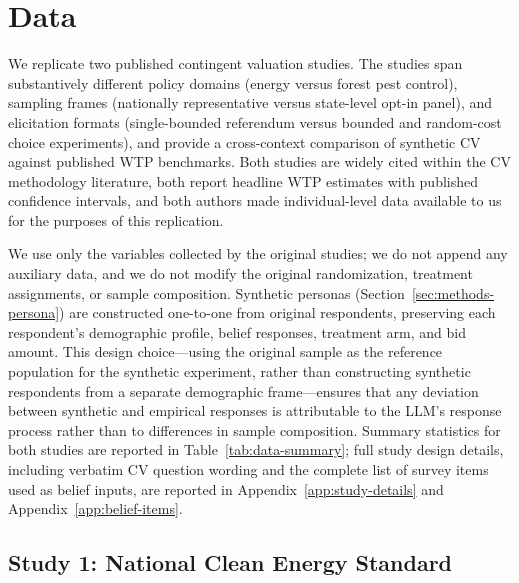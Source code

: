 \documentclass[12pt]{article}
\begin{document}
%

\section{Data}\label{sec:data}

We replicate two published contingent valuation studies. The studies span
substantively different policy domains (energy versus forest pest control),
sampling frames (nationally representative versus state-level opt-in panel),
and elicitation formats (single-bounded referendum versus bounded and
random-cost choice experiments), and provide a cross-context comparison of
synthetic CV against published WTP benchmarks. Both studies are widely
cited within the CV methodology literature, both report headline WTP
estimates with published confidence intervals, and both authors made
individual-level data available to us for the purposes of this replication.

We use only the variables collected by the original studies; we do not
append any auxiliary data, and we do not modify the original randomization,
treatment assignments, or sample composition. Synthetic personas
(Section~\ref{sec:methods-persona}) are constructed one-to-one from
original respondents, preserving each respondent's demographic profile,
belief responses, treatment arm, and bid amount. This design choice---using
the original sample as the reference population for the synthetic
experiment, rather than constructing synthetic respondents from a separate
demographic frame---ensures that any deviation between synthetic and
empirical responses is attributable to the LLM's response process rather
than to differences in sample composition. Summary statistics for both
studies are reported in Table~\ref{tab:data-summary}; full study design
details, including verbatim CV question wording and the complete list of
survey items used as belief inputs, are reported in
Appendix~\ref{app:study-details} and Appendix~\ref{app:belief-items}.

\label{tab:data-summary}


\subsection{Study 1: National Clean Energy Standard}\label{sec:data-nces}
\end{document}
